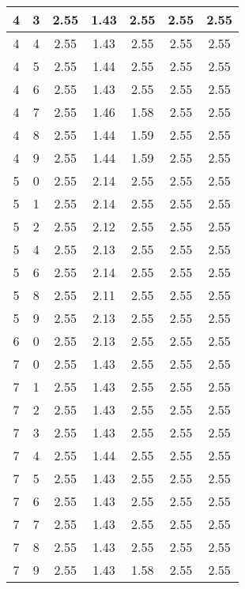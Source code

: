 \begin{longtable}{|c|c||c||c|c||c|c|}
	4 & 3 & 2.55 & 1.43 & 2.55 & 2.55 & 2.55 \\ \hline
	4 & 4 & 2.55 & 1.43 & 2.55 & 2.55 & 2.55 \\ \hline
	4 & 5 & 2.55 & 1.44 & 2.55 & 2.55 & 2.55 \\ \hline
	4 & 6 & 2.55 & 1.43 & 2.55 & 2.55 & 2.55 \\ \hline
	4 & 7 & 2.55 & 1.46 & 1.58 & 2.55 & 2.55 \\ \hline
	4 & 8 & 2.55 & 1.44 & 1.59 & 2.55 & 2.55 \\ \hline
	4 & 9 & 2.55 & 1.44 & 1.59 & 2.55 & 2.55 \\ \hline
	5 & 0 & 2.55 & 2.14 & 2.55 & 2.55 & 2.55 \\ \hline
	5 & 1 & 2.55 & 2.14 & 2.55 & 2.55 & 2.55 \\ \hline
	5 & 2 & 2.55 & 2.12 & 2.55 & 2.55 & 2.55 \\ \hline
	5 & 4 & 2.55 & 2.13 & 2.55 & 2.55 & 2.55 \\ \hline
	5 & 6 & 2.55 & 2.14 & 2.55 & 2.55 & 2.55 \\ \hline
	5 & 8 & 2.55 & 2.11 & 2.55 & 2.55 & 2.55 \\ \hline
	5 & 9 & 2.55 & 2.13 & 2.55 & 2.55 & 2.55 \\ \hline
	6 & 0 & 2.55 & 2.13 & 2.55 & 2.55 & 2.55 \\ \hline
	7 & 0 & 2.55 & 1.43 & 2.55 & 2.55 & 2.55 \\ \hline
	7 & 1 & 2.55 & 1.43 & 2.55 & 2.55 & 2.55 \\ \hline
	7 & 2 & 2.55 & 1.43 & 2.55 & 2.55 & 2.55 \\ \hline
	7 & 3 & 2.55 & 1.43 & 2.55 & 2.55 & 2.55 \\ \hline
	7 & 4 & 2.55 & 1.44 & 2.55 & 2.55 & 2.55 \\ \hline
	7 & 5 & 2.55 & 1.43 & 2.55 & 2.55 & 2.55 \\ \hline
	7 & 6 & 2.55 & 1.43 & 2.55 & 2.55 & 2.55 \\ \hline
	7 & 7 & 2.55 & 1.43 & 2.55 & 2.55 & 2.55 \\ \hline
	7 & 8 & 2.55 & 1.43 & 2.55 & 2.55 & 2.55 \\ \hline
	7 & 9 & 2.55 & 1.43 & 1.58 & 2.55 & 2.55 \\ \hline
\end{longtable}
\clearpage{}
